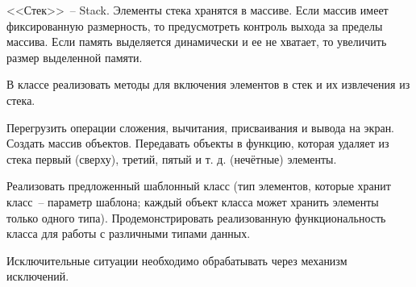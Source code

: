
<<Стек>>~-- Stack. Элементы стека хранятся в массиве. Если массив имеет фиксированную
размерность, то предусмотреть контроль выхода за пределы массива. Если память
выделяется динамически и ее не хватает, то увеличить размер выделенной памяти.

В
классе реализовать методы для включения элементов в стек и их извлечения из стека.

Перегрузить операции сложения, вычитания, присваивания и вывода на экран. Создать
массив объектов. Передавать объекты в функцию, которая удаляет из стека первый
(сверху), третий, пятый и т. д. (нечётные) элементы.

Реализовать предложенный шаблонный класс (тип элементов, которые
хранит класс~-- параметр шаблона; каждый объект класса может хранить
элементы только одного типа). Продемонстрировать реализованную
функциональность класса для работы с различными типами данных.


Исключительные ситуации необходимо обрабатывать через механизм исключений.
